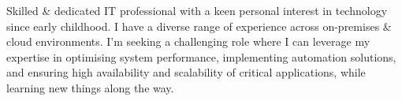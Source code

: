 \documentclass[9pt]{developercv}
\begin{document}
    \begin{minipage}[t]{0.62\textwidth}
        \vspace{-\baselineskip}
        \vspace{10pt}
        \color{gray}
        \color{navyblue}
    \end{minipage}
    \begin{minipage}[t]{0.225\textwidth}
        \vspace{-\baselineskip}


    \end{minipage}
    \begin{minipage}[t]{0.15\textwidth} %
        \vspace{-\baselineskip}

    \end{minipage}
    \vspace{0.4cm}




    \begin{minipage}[t]{1\textwidth}
        \vspace{-\baselineskip}
        Skilled \& dedicated IT professional with a keen personal interest in technology since early childhood.
        I have a diverse range of experience across on-premises \& cloud environments.
        I'm seeking a challenging role where I can leverage my expertise in optimising system performance,
        implementing automation solutions, and ensuring high availability and scalability of critical applications,
        while learning new things along the way.
    \end{minipage}

    \vspace{0.5cm}



\end{document}
